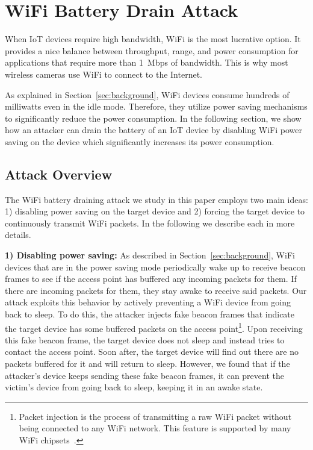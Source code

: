 
\section{WiFi Battery Drain Attack} \label{sec:wifi-battery-drain}
When IoT devices require high bandwidth, WiFi is the most lucrative option.
It provides a nice balance between throughput, range, and power consumption for applications that require more than 1~Mbps of bandwidth.
This is why most wireless cameras use WiFi to connect to the Internet. 

As explained in Section~\ref{sec:background}, WiFi devices consume hundreds of milliwatts even in the idle mode. Therefore, they utilize power saving mechanisms to significantly reduce the power consumption. In the following section, we show how an attacker can drain the battery of an IoT device by disabling WiFi power saving on the device which significantly increases its power consumption.



\subsection{Attack Overview}
The WiFi battery draining attack we study in this paper employs two main ideas: 1) disabling power saving on the target device and 2) forcing the target device to continuously transmit WiFi packets. In the following we describe each in more details.

\textbf{1) Disabling power saving:} As described in Section~\ref{sec:background}, WiFi devices that are in the power saving mode periodically wake up to receive beacon frames to see if the access point has buffered any incoming packets for them. 
If there are incoming packets for them, they stay awake to receive said packets. Our attack exploits this behavior by actively preventing a WiFi device from going back to sleep.
To do this, the attacker injects fake beacon frames that indicate the target device has some buffered packets on the access point\footnote{Packet injection is the process of transmitting a raw WiFi packet without being connected to any WiFi network. This feature is supported by many WiFi chipsets~\cite{beacon-stuffing-1, beacon-stuffing-2}.}. 
Upon receiving this fake beacon frame, the target device does not sleep and instead tries to contact the access point. 
Soon after, the target device will find out there are no packets buffered for it and will return to sleep. 
However, we found that if the attacker's device keeps sending these fake beacon frames, it can prevent the victim's device from going back to sleep, keeping it in an awake state.

